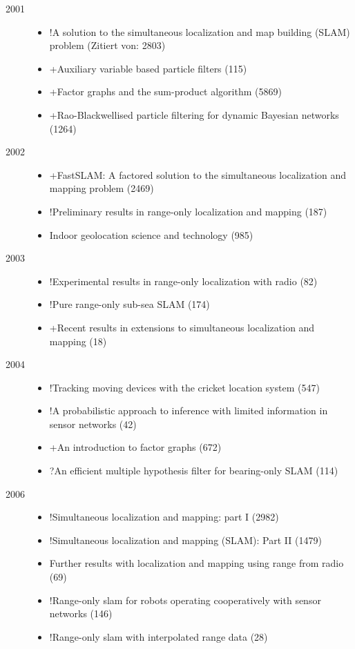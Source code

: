 \begin{description}

\item[2001]
\begin{itemize}
\item !A solution to the simultaneous localization and map building (SLAM) problem (Zitiert von: 2803)
\item +Auxiliary variable based particle filters (115)
\item +Factor graphs and the sum-product algorithm (5869)
\item +Rao-Blackwellised particle filtering for dynamic Bayesian networks (1264)
\end{itemize}

\item[2002]
\begin{itemize}
\item +FastSLAM: A factored solution to the simultaneous localization and mapping problem (2469)
\item !Preliminary results in range-only localization and mapping (187)
\item Indoor geolocation science and technology (985)
\end{itemize}

\item[2003]
\begin{itemize}
\item !Experimental results in range-only localization with radio (82)
\item !Pure range-only sub-sea SLAM (174)
\item +Recent results in extensions to simultaneous localization and mapping (18)
\end{itemize}

\item[2004]
\begin{itemize}
\item !Tracking moving devices with the cricket location system (547)
\item !A probabilistic approach to inference with limited information in sensor networks (42)
\item +An introduction to factor graphs (672)
\item ?An efficient multiple hypothesis filter for bearing-only SLAM (114)
\end{itemize}

\item[2006]
\begin{itemize}
\item !Simultaneous localization and mapping: part I (2982)
\item !Simultaneous localization and mapping (SLAM): Part II (1479)
\item Further results with localization and mapping using range from radio (69)
\item !Range-only slam for robots operating cooperatively with sensor networks (146)
\item !Range-only slam with interpolated range data (28)
\end{itemize}


\end{description}

